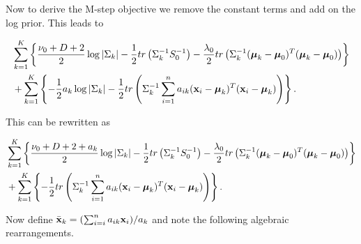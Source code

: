 \documentclass[12pt,english]{article}\usepackage[]{graphicx}\usepackage[]{color}
\begin{document}
Now to derive the M-step objective we remove the constant terms and
add on the log prior. This leads to

\begin{equation}
\begin{split}
 &\sum_{k=1}^{K} \left\{\frac{\nu_0 + D + 2 }{2} \log|\Sigma_k|  - \frac{1}{2} tr \left(\Sigma_{k}^{-1} S_0^{-1}\right) - \frac{\lambda_0}{2} tr \left( \Sigma_{k}^{-1}(\boldsymbol{\mu}_k - \boldsymbol{\mu}_0)^T(\boldsymbol{\mu}_k - \boldsymbol{\mu}_0) \right)\right\} \\
 & + \sum_{k=1}^{K} \left\{- \frac{1}{2}a_k\log|\Sigma_{k}| - \frac{1}{2} tr\left(\Sigma_{k}^{-1}\sum_{i=1}^{n}a_{ik}({\bf x}_i - \boldsymbol{\mu}_k)^{T}({\bf x}_i - \boldsymbol{\mu}_k)\right) \right\}.
\end{split}
\end{equation}

This can be rewritten as

\begin{equation}\label{equation::Mobj}
\begin{split}
&\sum_{k=1}^{K} \left\{\frac{\nu_0 + D + 2 + a_k }{2} \log|\Sigma_k|  - \frac{1}{2} tr \left(\Sigma_{k}^{-1} S_0^{-1}\right) - \frac{\lambda_0}{2} tr \left( \Sigma_{k}^{-1}(\boldsymbol{\mu}_k - \boldsymbol{\mu}_0)^T(\boldsymbol{\mu}_k - \boldsymbol{\mu}_0) \right)\right\} \\
& + \sum_{k=1}^{K} \left\{- \frac{1}{2} tr\left(\Sigma_{k}^{-1}\sum_{i=1}^{n}a_{ik}({\bf x}_i - \boldsymbol{\mu}_k)^{T}({\bf x}_i - \boldsymbol{\mu}_k)\right) \right\}.
\end{split}
\end{equation}

Now define $\bar{{\bf x}}_k = (\sum_{i=i}^{n}a_{ik}{\bf x}_i)/a_k$ and
note the following algebraic rearrangements.
\end{document}
